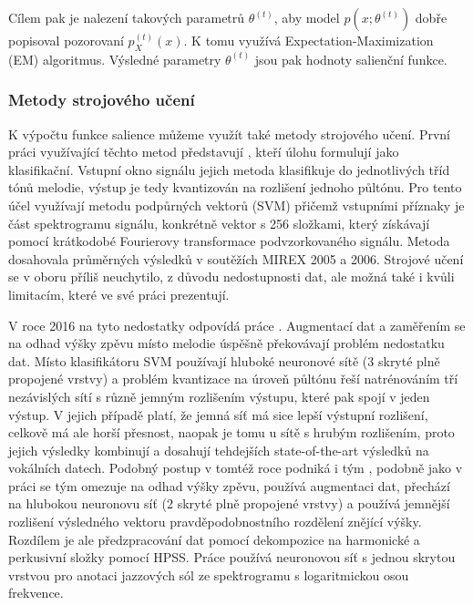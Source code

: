 Cílem pak je nalezení takových parametrů $\theta^{(t)}$, aby model $p(x; \theta^{(t)})$ dobře popisoval pozorovaní $p_X^{(t)}(x)$. K tomu \cite{Goto1999} využívá Expectation-Maximization (EM) algoritmus. Výsledné parametry $\theta^{(t)}$ jsou pak hodnoty salienční funkce.


\subsubsection{Metody strojového učení}

K výpočtu funkce salience můžeme využít také metody strojového učení. První práci využívající těchto metod představují \cite{Poliner}, kteří úlohu formulují jako klasifikační. Vstupní okno signálu jejich metoda klasifikuje do jednotlivých tříd tónů melodie, výstup je tedy kvantizován na rozlišení jednoho půltónu. Pro tento účel využívají metodu podpůrných vektorů (SVM) přičemž vstupními příznaky je část spektrogramu signálu, konkrétně vektor s 256 složkami, který získávají pomocí krátkodobé Fourierovy transformace podvzorkovaného signálu. Metoda dosahovala průměrných výsledků v soutěžích MIREX 2005 a 2006. Strojové učení se v oboru příliš neuchytilo, z důvodu nedostupnosti dat, ale možná také i kvůli limitacím, které \cite{Poliner} ve své práci prezentují.

V roce 2016 na tyto nedostatky odpovídá práce \cite{Kum2016}. Augmentací dat a zaměřením se na odhad výšky zpěvu místo melodie úspěšně překovávají problém nedostatku dat. Místo klasifikátoru SVM používají hluboké neuronové sítě (3 skryté plně propojené vrstvy) a problém kvantizace na úroveň půltónu řeší natrénováním tří nezávislých sítí s různě jemným rozlišením výstupu, které pak spojí v jeden výstup. V jejich případě platí, že jemná síť má sice lepší výstupní rozlišení, celkově má ale horší přesnost, naopak je tomu u sítě s hrubým rozlišením, proto jejich výsledky kombinují a dosahují tehdejších state-of-the-art výsledků na vokálních datech. Podobný postup v tomtéž roce podniká i tým \cite{Rigaud2016}, podobně jako v práci \cite{Kum2016} se tým omezuje na odhad výšky zpěvu, používá augmentaci dat, přechází na hlubokou neuronovu síť (2 skryté plně propojené vrstvy) a používá jemnější rozlišení výsledného vektoru pravděpodobnostního rozdělení znějící výšky. Rozdílem je ale předzpracování dat pomocí dekompozice na harmonické a perkusivní složky pomocí HPSS. Práce \cite{Balke2017} používá neuronovou síť s jednou skrytou vrstvou pro anotaci jazzových sól ze spektrogramu s logaritmickou osou frekvence. 

